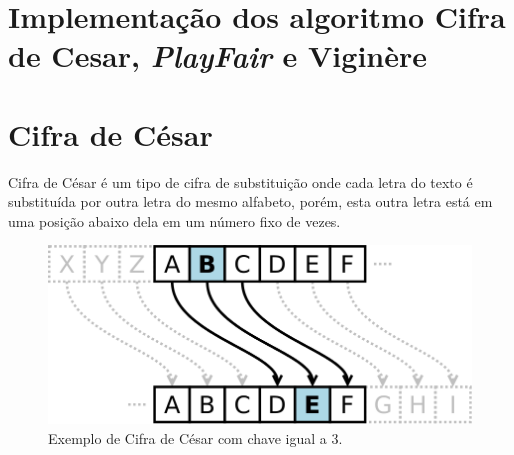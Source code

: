 \documentclass[
article,			%
11pt,				%
oneside,			%
a4paper,			%
english,			%
brazil,				%
sumario=tradicional
]{abntex2}
\begin{document}
	
	\frenchspacing 
	
	
	\maketitle
	
	
	
	\textual
	
	\section*{Implementação dos algoritmo Cifra de Cesar, \textit{PlayFair} e Viginère}
	
	\section{Cifra de César}
			Cifra de César é um tipo de cifra de substituição onde cada letra do texto é substituída por outra letra do mesmo alfabeto, porém, esta outra letra está em uma posição abaixo dela em um número fixo de vezes.
			
			
			\begin{figure} [!h]
			\centering
			\includegraphics[width=0.7\linewidth]{Imagens/cesar}
			\caption{Exemplo de Cifra de César com chave igual a 3.}
			\label{fig:cesar}
			\end{figure}
			
\end{document}
